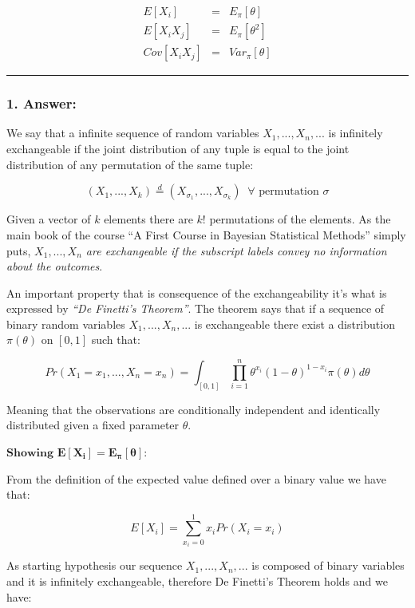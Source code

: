 \documentclass[
]{article}
\begin{document}
\begin{eqnarray*} 
E[X_i]&=&E_{\pi}[\theta]\\
E[X_i X_j] &=& E_{\pi}[\theta^2]\\
Cov[X_i X_j] &=& Var_{\pi}[\theta]
\end{eqnarray*}

\begin{center}\rule{0.5\linewidth}{0.5pt}\end{center}

\hypertarget{answer-10}{%
\subsubsection{1. Answer:}\label{answer-10}}

We say that a infinite sequence of random variables \(X_1,...,X_n,...\)
is infinitely exchangeable if the joint distribution of any tuple is
equal to the joint distribution of any permutation of the same tuple:

\[
(X_1,...,X_k) \stackrel{d}{=} (X_{\sigma_1},...,X_{\sigma_k}) \;\; \forall \text{ permutation } \sigma
\]

Given a vector of \(k\) elements there are \(k!\) permutations of the
elements. As the main book of the course ``A First Course in Bayesian
Statistical Methods'' simply puts, \emph{\(X_1,...,X_n\) are
exchangeable if the subscript labels convey no information about the
outcomes}.

An important property that is consequence of the exchangeability it's
what is expressed by \emph{``De Finetti's Theorem''}. The theorem says
that if a sequence of binary random variables \(X_1,...,X_n,...\) is
exchangeable there exist a distribution \(\pi(\theta)\) on \([0,1]\)
such that:

\[
Pr(X_1=x_1,...,X_n=x_n) = 
\int_{[0,1]} \prod_{i=1}^n\theta^{x_i}(1 - \theta)^{1 - x_i} \pi(\theta)d\theta
\]

Meaning that the observations are conditionally independent and
identically distributed given a fixed parameter \(\theta\).

\(\textbf{Showing } \mathbf{E[X_i]=E_{\pi}[\theta]}\):

From the definition of the expected value defined over a binary value we
have that:

\[
E[X_i] = \sum_{x_i=0}^1x_iPr(X_i=x_i)
\]

As starting hypothesis our sequence \(X_1,...,X_n,...\) is composed of
binary variables and it is infinitely exchangeable, therefore De
Finetti's Theorem holds and we have:
\end{document}
